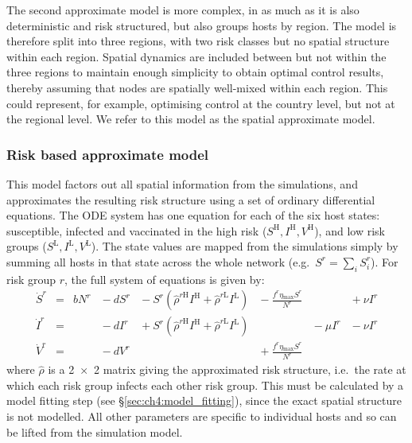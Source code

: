The second approximate model is more complex, in as much as it is also deterministic and risk structured, but also groups hosts by region. The model is therefore split into three regions, with two risk classes but no spatial structure within each region. Spatial dynamics are included between but not within the three regions to maintain enough simplicity to obtain optimal control results, thereby assuming that nodes are spatially well-mixed within each region. This could represent, for example, optimising control at the country level, but not at the regional level. We refer to this model as the spatial approximate model.

\subsubsection*{Risk based approximate model}

This model factors out all spatial information from the simulations, and approximates the resulting risk structure using a set of ordinary differential equations. The ODE system has one equation for each of the six host states: susceptible, infected and vaccinated in the high risk ($S^\mathrm{H}, I^\mathrm{H}, V^\mathrm{H}$), and low risk groups ($S^\mathrm{L}, I^\mathrm{L}, V^\mathrm{L}$). The state values are mapped from the simulations simply by summing all hosts in that state across the whole network (e.g.\ $S^r = \sum_{i}S^r_i$). For risk group $r$, the full system of equations is given by:
\begin{subequations}\label{eqn:ch4:risk_model}
\begin{alignat}{7}
    \dot{S}^r &={} &bN^r &{}-{} dS^r &{}-{} S^r\left(\hat{\rho}^{r\mathrm{H}}I^{\mathrm{H}} + \hat{\rho}^{r\mathrm{L}}I^{\mathrm{L}}\right) &{}-{} \frac{f^r\eta{}_\mathrm{max}S^r}{N^r} &&{}+{} \nu{}I^r \\
    \dot{I}^r &={}  &&{}-{} dI^r &{}+{} S^r\left(\hat{\rho}^{r\mathrm{H}}I^{\mathrm{H}} + \hat{\rho}^{r\mathrm{L}}I^{\mathrm{L}}\right)& &{}-{} \mu{}I^r &{}-{} \nu{}I^r \\
    \dot{V}^r &={}  &&{}-{} dV^r &&{}+{} \frac{f^r\eta{}_\mathrm{max}S^r}{N^r}&&
\end{alignat}
\end{subequations}
where $\hat{\rho}$ is a \num{2x2} matrix giving the approximated risk structure, i.e.\ the rate at which each risk group infects each other risk group. This must be calculated by a model fitting step (see \S\ref{sec:ch4:model_fitting}), since the exact spatial structure is not modelled. All other parameters are specific to individual hosts and so can be lifted from the simulation model.

